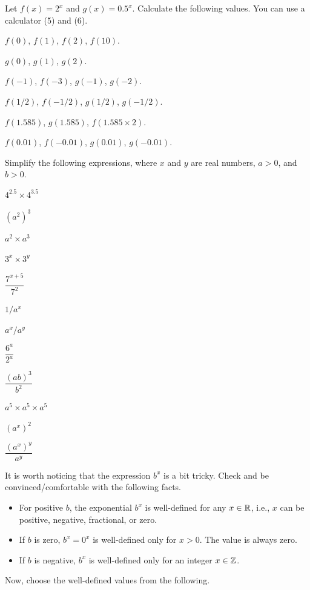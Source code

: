 \documentclass[11pt,pdfa,lastpage]{MishoNote}
\begin{document}
\begin{enumerate}
  \itemA Let $f(x)=2^x$ and $g(x)=0.5^x$.  Calculate the following values. You can use a calculator  (5) and (6).
  \begin{menumerate}{2}
    \item $f(0)$, $f(1)$, $f(2)$, $f(10)$.
    \item $g(0)$, $g(1)$, $g(2)$.
    \item $f(-1)$, $f(-3)$, $g(-1)$, $g(-2)$.
    \item $f(1/2)$, $f(-1/2)$, $g(1/2)$, $g(-1/2)$.
    \item $f(1.585)$, $g(1.585)$, $f(1.585\times 2)$.
    \item $f(0.01)$, $f(-0.01)$, $g(0.01)$, $g(-0.01)$.
  \end{menumerate}
  \itemA Simplify the following expressions, where $x$ and $y$ are real numbers, $a>0$, and $b>0$.
  \begin{menumerate}{3}
    \item $4^{2.5}\times 4^{3.5}$
    \item $(a^2)^3$
    \item $a^2\times a^3$
    \item $3^{x}\times 3^{y}$
    \item $\dfrac{7^{x+5}}{7^{2}}$
    \item $1/a^x$
    \item $a^x/a^y$
    \item $\dfrac{6^a}{2^a}$
    \item $\dfrac{(ab)^3}{b^2}$
    \item $a^5\times a^5\times a^5$
    \item $(a^x)^2$
    \item $\dfrac{(a^x)^y}{a^y}$
  \end{menumerate}
  \itemC It is worth noticing that the expression $b^x$ is a bit tricky. Check and be convinced/comfortable with the following facts.
  \begin{itemize}
    \item For positive $b$, the exponential $b^x$ is well-defined for any $x\in{\mathbb{R}}$, i.e., $x$ can be positive, negative, fractional, or zero.
    \item If $b$ is zero, $b^x=0^x$ is well-defined only for $x>0$. The value is always zero.
    \item If $b$ is negative, $b^x$ is well-defined only for an integer $x\in{\mathbb{Z}}$.
  \end{itemize}
  Now, choose the well-defined values from the following.

\end{enumerate}
\end{document}
